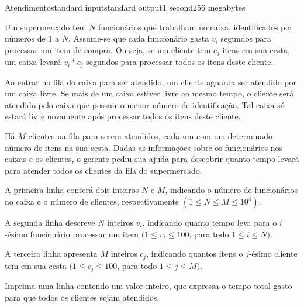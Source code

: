 \begin{problem}{Atendimento}{standard input}{standard output}{1 second}{256 megabytes}

Um supermercado tem $N$ funcionários que trabalham no caixa, identificados por números de $1$ a $N$. Assume-se que cada funcionário gasta $v_i$ segundos para processar um item de compra. Ou seja, se um cliente tem $c_j$ itens em sua cesta, um caixa levará $v_i*c_j$ segundos para processar todos os itens deste cliente.

Ao entrar na fila do caixa para ser atendido, um cliente aguarda ser atendido por um caixa livre. Se mais de um caixa estiver livre ao mesmo tempo, o cliente será atendido pelo caixa que possuir o menor número de identificação. Tal caixa só estará livre novamente após processar todos os itens deste cliente.

Há $M$ clientes na fila para serem atendidos, cada um com um determinado número de itens na sua cesta. Dadas as informações sobre os funcionários nos caixas e os clientes, o gerente pediu sua ajuda para descobrir quanto tempo levará para atender todos os clientes da fila do supermercado.

\InputFile
A primeira linha conterá dois inteiros $N$ e $M$, indicando o número de funcionários no caixa e o número de clientes, respectivamente $(1 \leq N \leq M \leq 10^4)$.

A segunda linha descreve $N$ inteiros $v_i$, indicando quanto tempo leva para o $i$-ésimo funcionário processar um item $(1 \leq v_i \leq 100$, para todo $1 \leq i \leq N)$.

A terceira linha apresenta $M$ inteiros $c_j$, indicando quantos itens o $j$-ésimo cliente tem em sua cesta $(1 \leq c_j \leq 100$, para todo $1 \leq j \leq M)$.

\OutputFile
Imprima uma linha contendo um valor inteiro, que expressa o tempo total gasto para que todos os clientes sejam atendidos.

\Examples

\begin{example}
%
%
%
\end{example}

\end{problem}

